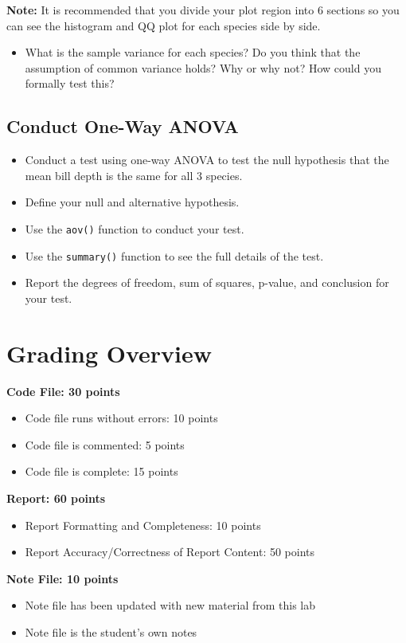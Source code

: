 \documentclass{article}
\begin{document}
\textbf{Note:} It is recommended that you divide your plot region into 6 sections so you can see the histogram and QQ plot for each species side by side.  


\begin{itemize}
    \item What is the sample variance for each species? Do you think that the assumption of common variance holds? Why or why not? How could you formally test this?
\end{itemize}

\subsection*{Conduct One-Way ANOVA}

\begin{itemize}
    \item Conduct a test using one-way ANOVA to test the null hypothesis that the mean bill depth is the same for all 3 species.
    \item Define your null and alternative hypothesis.
    \item Use the \texttt{aov()} function to conduct your test.
    \item Use the \texttt{summary()} function to see the full details of the test.
    \item Report the degrees of freedom, sum of squares, p-value, and conclusion for your test.
\end{itemize}

\newpage
\section*{Grading Overview}

\textbf{Code File: 30 points}
\begin{itemize}
    \item Code file runs without errors: 10 points
    \item Code file is commented: 5 points
    \item Code file is complete: 15 points
\end{itemize}

\textbf{Report: 60 points}
\begin{itemize}
    \item Report Formatting and Completeness: 10 points
    \item Report Accuracy/Correctness of Report Content: 50 points
\end{itemize}

\textbf{Note File: 10 points}
\begin{itemize}
    \item Note file has been updated with new material from this lab
    \item Note file is the student’s own notes
\end{itemize}
\end{document}
